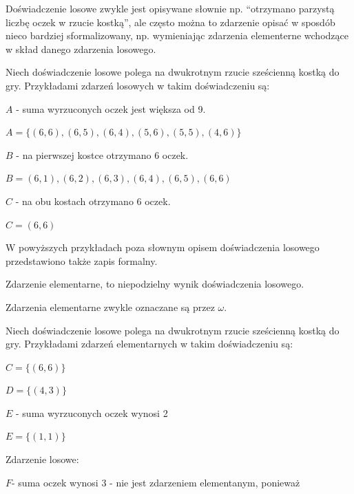 \documentclass[
  letterpaper,
  DIV=11,
  numbers=noendperiod]{scrreprt}
\begin{document}
Doświadczenie losowe zwykle jest opisywane słownie np. ``otrzymano
parzystą liczbę oczek w rzucie kostką'', ale często można to zdarzenie
opisać w sposdób nieco bardziej sformalizowany, np. wymieniając
zdarzenia elementerne wchodzące w skład danego zdarzenia losowego.

Niech doświadczenie losowe polega na dwukrotnym rzucie sześcienną kostką
do gry. Przykładami zdarzeń losowych w takim doświadczeniu są:

\(A\) - suma wyrzuconych oczek jest większa od 9.

\(A=\{{(6,6), (6,5), (6,4), (5,6), (5,5), (4,6)\}}\)

\(B\) - na pierwszej kostce otrzymano 6 oczek.

\(B = {(6,1), (6,2), (6,3), (6,4), (6,5), (6,6)}\)

\(C\) - na obu kostach otrzymano 6 oczek.

\(C = {(6,6)}\)

W powyższych przykładach poza słownym opisem doświadczenia losowego
przedstawiono także zapis formalny.

\begin{tcolorbox}[enhanced jigsaw, toprule=.15mm, title=\textcolor{quarto-callout-note-color}{\faInfo}\hspace{0.5em}{Zdarzenie elementarne}, breakable, coltitle=black, titlerule=0mm, colbacktitle=quarto-callout-note-color!10!white, opacitybacktitle=0.6, opacityback=0, bottomtitle=1mm, left=2mm, arc=.35mm, leftrule=.75mm, bottomrule=.15mm, rightrule=.15mm, toptitle=1mm, colframe=quarto-callout-note-color-frame, colback=white]

Zdarzenie elementarne, to niepodzielny wynik doświadczenia losowego.

\end{tcolorbox}

Zdarzenia elementarne zwykle oznaczane są przez \(\omega\).

Niech doświadczenie losowe polega na dwukrotnym rzucie sześcienną kostką
do gry. Przykładami zdarzeń elementarnych w takim doświadczeniu są:

\(C= \{{(6,6)}\}\)

\(D= \{{(4,3)}\}\)

\(E\) - suma wyrzuconych oczek wynosi 2

\(E = \{{(1,1)}\}\)

Zdarzenie losowe:

\(F\)- suma oczek wynosi 3 - nie jest zdarzeniem elementanym, ponieważ
\end{document}
